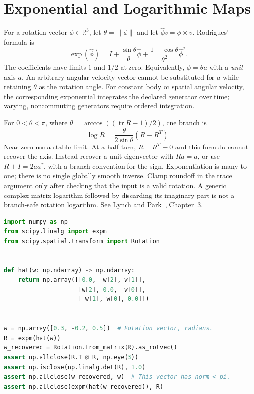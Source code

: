 \documentclass[10pt,letterpaper,openany]{book}
\theoremstyle{plain}
\theoremstyle{definition}
\theoremstyle{remark}
\renewcommand{\R}{\mathbb{R}}
\newcommand{\trace}{\operatorname{tr}}
\begin{document}
\section{Exponential and Logarithmic Maps}

For a rotation vector $\phi\in\R^3$, let $\theta=\|\phi\|$ and let
$\widehat\phi v=\phi\times v$. Rodrigues' formula is
\[
 \exp(\widehat\phi)=I+\frac{\sin\theta}{\theta}\widehat\phi
       +\frac{1-\cos\theta}{\theta^2}\widehat\phi^2.
\]
The coefficients have limits $1$ and $1/2$ at zero. Equivalently,
$\phi=\theta a$ with a \emph{unit} axis $a$. An arbitrary angular-velocity vector
cannot be substituted for $a$ while retaining $\theta$ as the rotation angle.
For constant body or spatial angular velocity, the corresponding exponential
integrates the declared generator over time; varying, noncommuting generators
require ordered integration.

For $0<\theta<\pi$, where
$\theta=\arccos((\trace R-1)/2)$, one branch is
\[
 \log R=\frac{\theta}{2\sin\theta}(R-R^T).
\]
Near zero use a stable limit. At a half-turn, $R-R^T=0$ and this formula cannot
recover the axis. Instead recover a unit eigenvector with $Ra=a$, or use
$R+I=2aa^T$, with a branch convention for the sign. Exponentiation is many-to-one;
there is no single globally smooth inverse. Clamp roundoff in the trace argument
only after checking that the input is a valid rotation. A generic complex matrix
logarithm followed by discarding its imaginary part is not a branch-safe rotation
logarithm. See Lynch and Park~\cite{Lynch2017}, Chapter~3.

\noindent\begin{minipage}{\linewidth}
\begin{example}\label{app-so3-exp-log}
\leavevmode\par
\begin{lstlisting}[language=Python]
import numpy as np
from scipy.linalg import expm
from scipy.spatial.transform import Rotation


def hat(w: np.ndarray) -> np.ndarray:
    return np.array([[0.0, -w[2], w[1]],
                     [w[2], 0.0, -w[0]],
                     [-w[1], w[0], 0.0]])


w = np.array([0.3, -0.2, 0.5])  # Rotation vector, radians.
R = expm(hat(w))
w_recovered = Rotation.from_matrix(R).as_rotvec()
assert np.allclose(R.T @ R, np.eye(3))
assert np.isclose(np.linalg.det(R), 1.0)
assert np.allclose(w_recovered, w)  # This vector has norm < pi.
assert np.allclose(expm(hat(w_recovered)), R)
\end{lstlisting}
\end{example}
\end{minipage}
\end{document}
